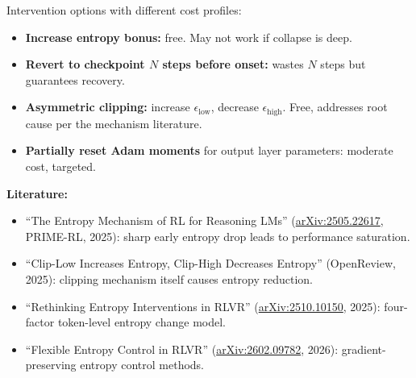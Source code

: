 Intervention options with different cost profiles:
\begin{itemize}
  \item \textbf{Increase entropy bonus:} free. May not work if collapse is deep.
  \item \textbf{Revert to checkpoint $N$ steps before onset:} wastes $N$ steps but guarantees recovery.
  \item \textbf{Asymmetric clipping:} increase $\epsilon_{\mathrm{low}}$, decrease $\epsilon_{\mathrm{high}}$. Free, addresses root cause per the mechanism literature.
  \item \textbf{Partially reset Adam moments} for output layer parameters: moderate cost, targeted.
\end{itemize}

\textbf{Literature:}
\begin{itemize}
  \item ``The Entropy Mechanism of RL for Reasoning LMs'' (\href{https://arxiv.org/abs/2505.22617}{arXiv:2505.22617}, PRIME-RL, 2025): sharp early entropy drop leads to performance saturation.
  \item ``Clip-Low Increases Entropy, Clip-High Decreases Entropy'' (OpenReview, 2025): clipping mechanism itself causes entropy reduction.
  \item ``Rethinking Entropy Interventions in RLVR'' (\href{https://arxiv.org/abs/2510.10150}{arXiv:2510.10150}, 2025): four-factor token-level entropy change model.
  \item ``Flexible Entropy Control in RLVR'' (\href{https://arxiv.org/abs/2602.09782}{arXiv:2602.09782}, 2026): gradient-preserving entropy control methods.
\end{itemize}

